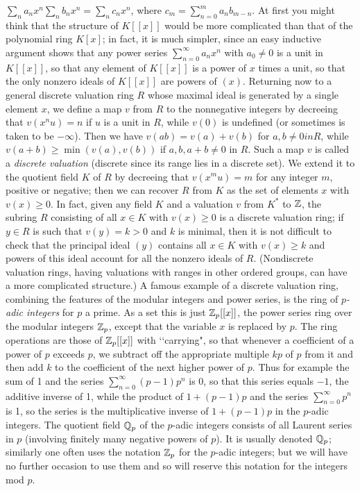 $\sum_n a_n x^n \sum_n b_n x^n = \sum_n c_n x^n$, where $c_m = \sum_{n=0}^m a_n b_{m-n}$.  At first you might think that the structure of $K[[x]]$ would be more complicated than that of the polynomial ring $K[x]$; in fact, it is much simpler, since an easy inductive argument shows that any power series $\sum_{n=0}^\infty a_n x^n$ with $a_0\ne0$ is a unit in $K[[x]]$, so that any element of $K[[x]]$ is a power of $x$ times a unit, so that the only nonzero ideals of $K[[x]]$ are powers of $(x)$.  Returning now to a general discrete valuation ring $R$ whose maximal ideal is generated by a single element $x$, we define a map $v$ from $R$ to the nonnegative integers by decreeing that $v(x^n u) = n$ if $u$ is a unit in $R$, while $v(0)$ is undefined (or sometimes is taken to be $-\infty$).  Then we have $v(ab) = v(a) + v(b)$ for $a,b\ne0 in R$, while $v(a+b)\ge\min(v(a),v(b))$ if $a,b,a+b\ne0$ in $R$.  Such a map $v$ is called a {\sl discrete valuation} (discrete since its range lies in a discrete set).  We extend it to the quotient field $K$ of $R$ by decreeing that $v(x^m u) = m$ for any integer $m$, positive or negative; then we can recover $R$ from $K$ as the set of elements $x$ with $v(x)\ge0$.  In fact, given any field $K$ and a valuation $v$ from $K^*$ to $\Bbb Z$, the subring $R$ consisting of all $x\in K$ with $v(x)\ge0$ is a discrete valuation ring; if $y\in R$ is such that $v(y)=k>0$ and $k$ is minimal, then it is not difficult to check that the principal ideal $(y)$ contains all $x\in K$ with $v(x)\ge k$ and powers of this ideal account for all the nonzero ideals of $R$.  (Nondiscrete valuation rings, having valuations with ranges in other ordered groups, can have a more complicated structure.)  A famous example of a discrete valuation ring, combining the features of the modular integers and power series, is the ring of {\sl $p$-adic integers} for $p$ a prime.  As a set this is just $\Bbb Z_p[[x]]$, the power series ring over the modular integers $\Bbb Z_p$, except that the variable $x$ is replaced by $p$.  The ring operations are those of $\Bbb Z_p[[x]]$ with \lq\lq carrying", so that whenever a coefficient of a power of $p$ exceeds $p$, we subtract off the appropriate multiple $kp$ of $p$ from it and then add $k$ to the coefficient of the next higher power of $p$.  Thus for example the sum of 1 and the series $\sum_{n=0}^\infty (p-1)p^n$ is 0, so that this series equals $-1$, the additive inverse of 1, while the product of $1+(p-1)p$ and the series $\sum_{n=0}^\infty p^n$ is 1, so the series is the multiplicative inverse of $1+(p-1)p$ in the $p$-adic integers.  The quotient field $\Bbb Q_p$ of the $p$-adic integers consists of all Laurent series in $p$ (involving finitely many negative powers of $p$).  It is usually denoted $\Bbb Q_p$; similarly one often uses the notation
$\Bbb Z_p$ for the $p$-adic integers; but we will have no further occasion to use them and so will reserve this notation for the integers mod $p$.

